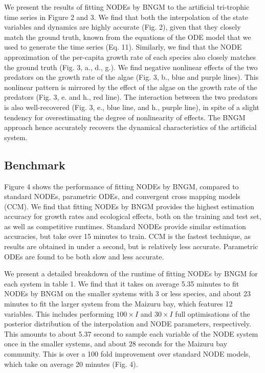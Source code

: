 \documentclass[11pt, oneside]{article}
\begin{document}
We present the results of fitting NODEs by BNGM to the artificial tri-trophic time series in Figure 2 and 3.
We find that both the interpolation of the state variables and dynamics are highly accurate (Fig. 2), given that they closely match the ground truth, known from the equations of the ODE model that we used to generate the time series (Eq. 11).
Similarly, we find that the NODE approximation of the per-capita growth rate of each species also closely matches the ground truth (Fig. 3, a., d., g.). 
We find negative nonlinear effects of the two predators on the growth rate of the algae (Fig. 3, b., blue and purple lines).
This nonlinear pattern is mirrored by the effect of the algae on the growth rate of the predators (Fig. 3, e. and h., red line).
The interaction between the two predators is also well-recovered (Fig. 3, e., blue line, and h., purple line), in spite of a slight tendency for overestimating the degree of nonlinearity of effects.
The BNGM approach hence accurately recovers the dynamical characteristics of the artificial system.

\subsection{Benchmark}

Figure 4 shows the performance of fitting NODEs by BNGM, compared to standard NODEs, parametric ODEs, and convergent cross mapping models (CCM).
We find that fitting NODEs by BNGM provides the highest estimation accuracy for growth rates and ecological effects, both on the training and test set, as well as competitive runtimes. 
Standard NODEs provide similar estimation accuracies, but take over 15 minutes to train. 
CCM is the fastest technique, as results are obtained in under a second, but is relatively less accurate.
Parametric ODEs are found to be both slow and less accurate.

We present a detailed breakdown of the runtime of fitting NODEs by BNGM for each system in table 1.
We find that it takes on average 5.35 minutes to fit NODEs by BNGM on the smaller systems with 3 or less species, and about 23 minutes to fit the larger system from the Maizuru bay, which features 12 variables.
This includes performing $100 \times I$ and $30 \times I$ full optimisations of the posterior distribution of the interpolation and NODE parameters, respectively. 
This amounts to about 5.37 second to sample each variable of the NODE system once in the smaller systems, and about 28 seconds for the Maizuru bay community.
This is over a 100 fold improvement over standard NODE models, which take on average 20 minutes (Fig. 4).
\end{document}
